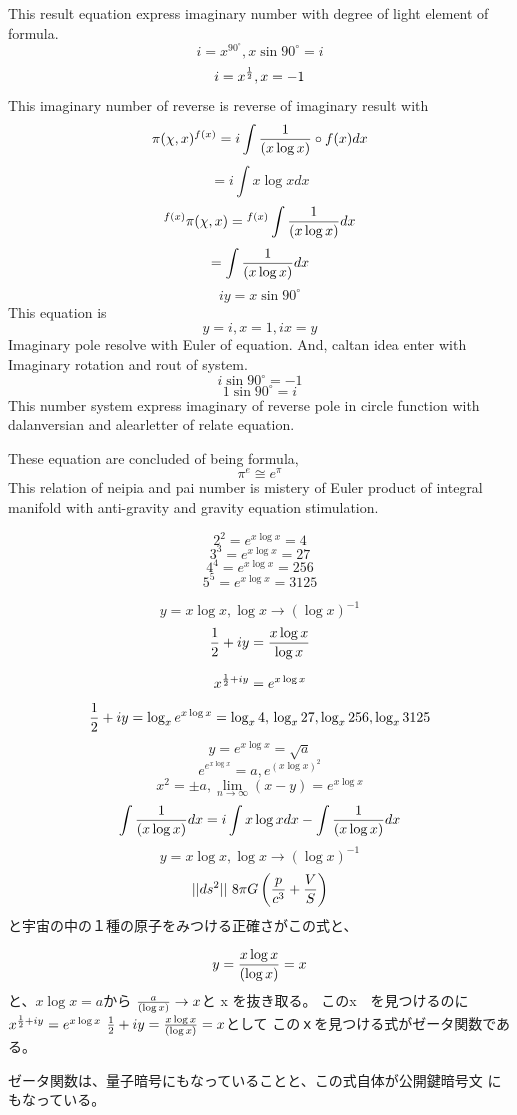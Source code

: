 \documentclass{jsarticle}
\begin{document}
    This result equation express imaginary number with degree
    of light element of formula.
    $$ i = x^{90^{\circ}}, x\sin 90^{\circ} = i$$
    $$ i = x^{1 \over 2},x= -1 $$
    This imaginary number of reverse is reverse of imaginary result with
    $$ \pi(\chi,x)^{f(x)} = i \int{1 \over {(x\log x)}}\circ f(x)dx $$
    $$ = i \int x \log x dx $$
    $$ {}^{f(x)}\pi(\chi,x) = {}^{f(x)}\int{1 \over {(x\log x)}}dx $$
    $$ = \int {1 \over {(x\log x)}}dx $$
    $$ iy = x\sin 90^{\circ} $$
    This equation is 
    $$ y = i, x = 1, ix = y $$
    Imaginary pole resolve with Euler of equation. And, caltan idea enter
    with Imaginary rotation and rout of system.
    $$ i \sin 90^{\circ} = -1 $$
    $$ 1 \sin 90^{\circ} = i $$
    This number system express imaginary of reverse pole in circle function
    with dalanversian and alearletter of relate equation.
    
    These equation are concluded of being formula,
    $$ \pi^{e} \cong e^{\pi} $$
    This relation of neipia and pai number is mistery of Euler product 
    of integral manifold with anti-gravity and gravity equation stimulation.

   $$ 2^2 = e^{x \log x} = 4 $$
   $$ 3^3 = e^{x \log x} = 27 $$
   $$ 4^4 = e^{x \log x} = 256 $$
   $$ 5^5 = e^{x \log x} = 3125 $$


    $$ y = x \log x, \log x \to (\log x)^{-1}  $$
    $$ {1 \over 2} + iy = {{x \log x} \over \log x}$$


   $$ x^{{1 \over 2} + iy} = e^{x \log x} $$
   $$ {1 \over 2} + iy = \log_{x}e^{x \log x} = \log_{x} 4, \\
   \log_{x} 27, \log_{x} 256, \log_{x} 3125 $$
   $$ y = e^{x \log x} = \sqrt{a} $$
   $$ e^{e^{x \log x}} = a, e^{(x\log x)^2} $$
   $$ x^2 = \pm a, \lim_{n \to \infty} (x - y) = e^{x \log x} $$
   $$ \int {1 \over (x \log x)}dx = i \int x \log x dx 
   - \int {1 \over (x \log x)}dx $$
   $$ y = x \log x, \log x \to (\log x)^{-1}  $$
   $$ ||ds^2|| ~ 8 \pi G\left({p \over c^3} + {V \over S}\right)$$
   と宇宙の中の１種の原子をみつける正確さがこの式と、


   $$ y = {{x \log x} \over (\log x)} = x $$
   と、$x \log x = a$から ${a \over (\log x)} \to x $と x を抜き取る。
   このx　を見つけるのに　$x^{{1 \over 2} + iy} = e^{x \log x} $
   ${1 \over 2} + iy= {{x \log x} \over (\log x)} = x$として
   このｘを見つける式がゼータ関数である。


   ゼータ関数は、量子暗号にもなっていることと、この式自体が公開鍵暗号文
    にもなっている。
\end{document}

